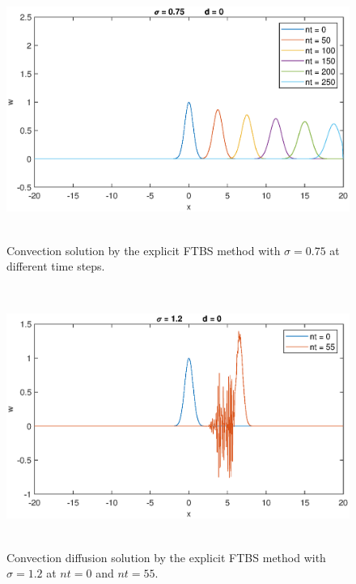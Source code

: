 \documentclass[letterpaper,12pt]{article}
\begin{document}
\begin{figure}[!ht] 
	\centering 
	\includegraphics[max height=8.5cm]{graphs/FTBS/Convection/sigma075d0.eps}
	\caption{Convection solution by the explicit FTBS method with $\sigma= 0.75$ at different time steps.}
	 \label{fig:FTBSsigma075d0}
\end{figure}
\begin{figure}[!ht] 
	\centering 
	\includegraphics[max height=8.5cm]{graphs/FTBS/Convection/sigma12d0.eps}
	\caption{Convection diffusion solution by the explicit FTBS method with $\sigma= 1.2$ at $nt=0$ and $nt=55$.}
	 \label{fig:FTBSsigma12d0}
\end{figure}
\newpage
\end{document}
